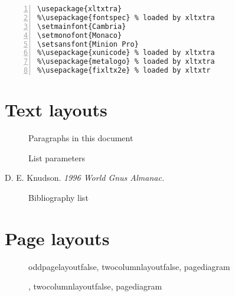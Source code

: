 \documentclass[draft=false]{book}
\begin{document}
\begin{Verbatim}[numbers=left, framerule=1pt]
% see http://www.ctan.org/tex-archive/macros/xetex/latex/xltxtra/xltxtra.pdf
\usepackage{xltxtra} 
%\usepackage{fontspec} % loaded by xltxtra
\setmainfont{Cambria}
\setmonofont{Monaco}
\setsansfont{Minion Pro}
%\usepackage{xunicode} % loaded by xltxtra
%\usepackage{metalogo} % loaded by xltxtra
%\usepackage{fixltx2e} % loaded by xltxtr
\end{Verbatim}

\clearpage

\section{Text layouts}

\currentparagraph
\begin{figure}
\caption{Paragraphs in this document}
\paragraphdesign
\end{figure}

\begin{figure}
\listdiagram
\caption{List parameters}
\end{figure}

\begin{thebibliography}{Dillo 83}
 D. E. Knudson. \emph{1996 World Gnus Almanac.}
\currentlist
\begin{figure}
\listdesign
\caption{Bibliography list}
\end{figure}
\end{thebibliography}

\section{Page layouts}

\layout

\currentpage
\begin{figure}
\oddpagelayoutfalse
\twocolumnlayoutfalse
\pagediagram
\caption{oddpagelayoutfalse, twocolumnlayoutfalse, pagediagram}
\end{figure}


\currentpage
\begin{figure}
\oddpagelayouttrue
\twocolumnlayoutfalse
\pagediagram
\caption{\oddpagelayouttrue, twocolumnlayoutfalse, pagediagram}
\end{figure}
\end{document}
